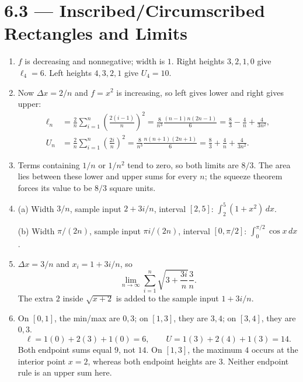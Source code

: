 \documentclass[11pt]{article}
\newcommand{\dx}{\,dx}
\newcommand{\topic}[2]{\clearpage\section*{#1 --- #2}}
\begin{document}
\topic{6.3}{Inscribed/Circumscribed Rectangles and Limits}
\begin{enumerate}[itemsep=0.65em]
\item $f$ is decreasing and nonnegative; width is $1$. Right heights $3,2,1,0$ give
$\boxed{\ell_4=6}$. Left heights $4,3,2,1$ give $\boxed{U_4=10}$.
\begin{center}
\end{center}
\item Now $\Delta x=2/n$ and $f=x^2$ is increasing, so left gives lower and right gives upper:
\begin{align*}
\ell_n&=\frac2n\sum_{i=1}^n\left(\frac{2(i-1)}n\right)^2
=\frac8{n^3}\frac{(n-1)n(2n-1)}6
=\boxed{\frac83-\frac4n+\frac4{3n^2}},\\
U_n&=\frac2n\sum_{i=1}^n\left(\frac{2i}n\right)^2
=\frac8{n^3}\frac{n(n+1)(2n+1)}6
=\boxed{\frac83+\frac4n+\frac4{3n^2}}.
\end{align*}
\item Terms containing $1/n$ or $1/n^2$ tend to zero, so both limits are $\boxed{8/3}$.
The area lies between these lower and upper sums for every $n$; the squeeze theorem forces its value to be $\boxed{8/3}$ square units.
\item (a) Width $3/n$, sample input $2+3i/n$, interval $[2,5]$:
$\boxed{\int_2^5(1+x^2)\dx}$.

(b) Width $\pi/(2n)$, sample input $\pi i/(2n)$, interval $[0,\pi/2]$:
$\boxed{\int_0^{\pi/2}\cos x\dx}$.
\item $\Delta x=\boxed{3/n}$ and $x_i=\boxed{1+3i/n}$, so
\[
\boxed{\lim_{n\to\infty}\sum_{i=1}^n
\sqrt{3+\frac{3i}{n}}\frac3n}.
\]
The extra $2$ inside $\sqrt{x+2}$ is added to the sample input $1+3i/n$.
\item On $[0,1]$, the min/max are $0,3$; on $[1,3]$, they are $3,4$; on $[3,4]$, they are $0,3$.
\[
\ell=1(0)+2(3)+1(0)=\boxed6,\qquad
U=1(3)+2(4)+1(3)=\boxed{14}.
\]
Both endpoint sums equal $9$, not $14$. On $[1,3]$, the maximum $4$ occurs at the interior point $x=2$, whereas both endpoint heights are $3$. Neither endpoint rule is an upper sum here.
\end{enumerate}
\end{document}
